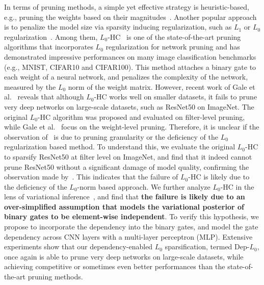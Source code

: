 \documentclass[runningheads, envcountsame, a4paper]{llncs}
\begin{document}
In terms of pruning methods, a simple yet effective strategy is heuristic-based, e.g., pruning the weights based on their magnitudes~\cite{lecun1990optimal,han2015learning,li2016pruning,hu2016network}. Another popular approach is to penalize the model size via sparsity inducing regularization, such as $L_1$ or $L_0$ regularization~\cite{liu2015sparse,wen2016ssl,louizos2017learning}. Among them, $L_0$-HC~\cite{louizos2017learning} is one of the state-of-the-art pruning algorithms that incorporates $L_0$ regularization for network pruning and has demonstrated impressive performances on many image classification benchmarks (e.g., MNIST, CIFAR10 and CIFAR100). This method attaches a binary gate to each weight of a neural network, and penalizes the complexity of the network, measured by the $L_0$ norm of the weight matrix. However, recent work of Gale et al.~\cite{gale2019state} reveals that although $L_0$-HC works well on smaller datasets, it fails to prune very deep networks on large-scale datasets, such as ResNet50 on ImageNet. The original $L_0$-HC algorithm was proposed and evaluated on filter-level pruning, while Gale et al.~\cite{gale2019state} focus on the weight-level pruning. Therefore, it is unclear if the observation of~\cite{gale2019state} is due to pruning granularity or the deficiency of the $L_0$ regularization based method. To understand this, we evaluate the original $L_0$-HC to sparsify ResNet50 at filter level on ImageNet, and find that it indeed cannot prune ResNet50 without a significant damage of model quality, confirming the observation made by~\cite{gale2019state}. This indicates that the failure of $L_0$-HC is likely due to the deficiency of the $L_0$-norm based approach. We further analyze $L_0$-HC in the lens of variational inference~\cite{viBlei}, and find that \textbf{the failure is likely due to an over-simplified assumption that models the variational posterior of binary gates to be element-wise independent}. To verify this hypothesis, we propose to incorporate the dependency into the binary gates, and model the gate dependency across CNN layers with a multi-layer perceptron (MLP). Extensive experiments show that our dependency-enabled $L_0$ sparsification, termed Dep-$L_0$, once again is able to prune very deep networks on large-scale datasets, while achieving competitive or sometimes even better performances than the state-of-the-art pruning methods. 
\end{document}
